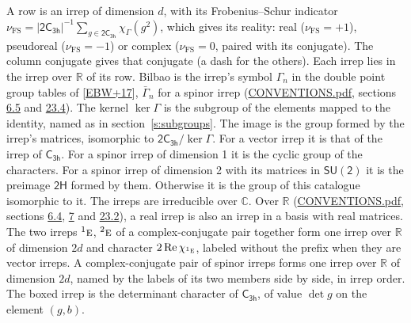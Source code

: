 \documentclass[10pt,a4paper]{article}
\numberwithin{equation}{section}
\newcommand{\grp}[1]{\mathsf{#1}}
\newcommand{\irr}[1]{\text{\normalfont\scshape #1}}
\newcommand{\conjpair}[1]{{}^{#1}}
\newcommand{\irchar}[1]{\chi_{#1}}
\newcommand{\fsind}{\nu_{\mathrm{FS}}}
\begin{document}
\leavevmode\label{n:index.frobenius}\label{n:head.irrep}\label{n:head.reality}A row is an irrep of dimension $d$, with its Frobenius--Schur indicator $\fsind = |\grp{2C_{3h}}|^{-1}\allowbreak\sum_{g\in\grp{2C_{3h}}}\irchar{\Gamma}(g^2)$, which gives its reality: real ($\fsind = +1$), pseudoreal ($\fsind = -1$) or complex ($\fsind = 0$, paired with its conjugate). \label{n:head.conjugate}The column conjugate gives that conjugate (a dash for the others). \label{n:head.over.real}Each irrep lies in the irrep over $\mathbb{R}$ of its row. \label{n:head.bilbao}\label{n:irrep.alias.gamma}Bilbao is the irrep's symbol $\Gamma_n$ in the double point group tables of [\href{../../../REFERENCES.pdf\#ref.EBW+17}{EBW+17}], $\bar{\Gamma}_n$ for a spinor irrep (\href{../../CONVENTIONS.pdf}{CONVENTIONS.pdf}, sections \href{../../../rotation/CONVENTIONS.pdf\#conv.6.5}{6.5} and \href{../../CONVENTIONS.pdf\#conv.23.4}{23.4}). \label{n:head.kernel}The kernel $\ker\Gamma$ is the subgroup of the elements mapped to the identity, named as in section~\ref{s:subgroups}. \label{n:head.image}The image is the group formed by the irrep's matrices, isomorphic to $\grp{2C_{3h}}/\ker\Gamma$. For a vector irrep it is that of the irrep of \href{../../../rotation/data/pdf/C3h.pdf}{$\grp{C_{3h}}$}. For a spinor irrep of dimension 1 it is the cyclic group of the characters. For a spinor irrep of dimension 2 with its matrices in $\grp{SU(2)}$ it is the preimage $\grp{2H}$ formed by them. Otherwise it is the group of this catalogue isomorphic to it. The irreps are irreducible over $\mathbb{C}$. Over $\mathbb{R}$ (\href{../../CONVENTIONS.pdf}{CONVENTIONS.pdf}, sections \href{../../../rotation/CONVENTIONS.pdf\#conv.6.4}{6.4}, \href{../../../rotation/CONVENTIONS.pdf\#conv.7}{7} and \href{../../CONVENTIONS.pdf\#conv.23.2}{23.2}), a real irrep is also an irrep in a basis with real matrices. The two irreps $\conjpair{1}\irr{e}$, $\conjpair{2}\irr{e}$ of a complex-conjugate pair together form one irrep over $\mathbb{R}$ of dimension $2d$ and character $2\operatorname{Re}\irchar{\conjpair{1}\irr{e}}$, labeled without the prefix when they are vector irreps. A complex-conjugate pair of spinor irreps forms one irrep over $\mathbb{R}$ of dimension $2d$, named by the labels of its two members side by side, in irrep order. \label{n:mark.determinant}The boxed irrep is the determinant character of \href{../../../rotation/data/pdf/C3h.pdf}{$\grp{C_{3h}}$}, of value $\det g$ on the element $(g, b)$.
\setlength{\emergencystretch}{2em}\par\setlength{\emergencystretch}{0pt}
\end{document}
